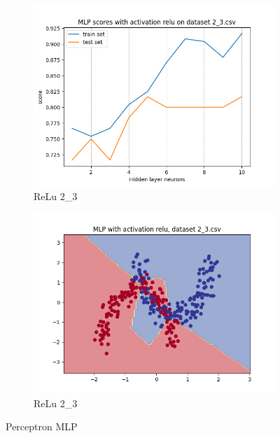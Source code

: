 \documentclass[12pt]{article}
\newcommand*{\subfigwidth}{0.24\textwidth}
\begin{document}
\begin{figure}[H]
\begin{subfigure}[t]{\subfigwidth}
        \includegraphics[width=\linewidth]{img/exp_1/mlp/2_3/relu/scores.png}
        \caption{ReLu 2\_3}
    \end{subfigure}
    \hfill
    \begin{subfigure}[t]{\subfigwidth}
        \includegraphics[width=\linewidth]{img/exp_1/mlp/2_3/relu/boundary.png}
        \caption{ReLu 2\_3}
    \end{subfigure}
    \caption{Perceptron MLP}
\end{figure}
\end{document}
